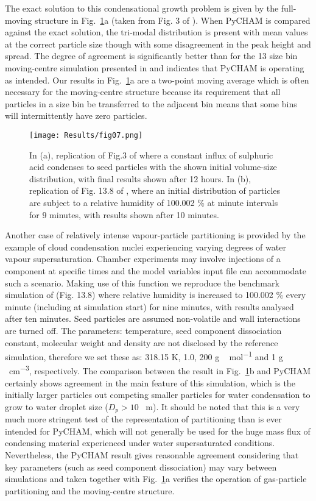 \documentclass[gmd, manuscript]{copernicus}
\begin{document}
The exact solution to this condensational growth problem is given by the full-moving structure in Fig.~\ref{fig:mov_cen_test}a (taken from Fig. 3 of \citet{Zhang1999}).  When PyCHAM is compared against the exact solution, the tri-modal distribution is present with mean values at the correct particle size though with some disagreement in the peak height and spread.  The degree of agreement is significantly better than for the 13 size bin moving-centre simulation presented in \citet{Zhang1999} and indicates that PyCHAM is operating as intended.  Our results in Fig.~\ref{fig:mov_cen_test}a are a two-point moving average which is often necessary for the moving-centre structure because its requirement that all particles in a size bin be transferred to the adjacent bin means that some bins will intermittently have zero particles.

\begin{figure}[t]
\texttt{[image: Results/fig07.png]}
\caption{In (a), replication of Fig.3 of \citet{Zhang1999} where a constant influx of sulphuric acid condenses to seed particles with the shown initial volume-size distribution, with final results shown after 12 hours.  In (b), replication of Fig. 13.8 of \citet{Jacobson2005}, where an initial distribution of particles are subject to a relative humidity of 100.002 \% at minute intervals for 9 minutes, with results shown after 10 minutes.}
\label{fig:mov_cen_test}
\end{figure}

Another case of relatively intense vapour-particle partitioning is provided by the example of cloud condensation nuclei experiencing varying degrees of water vapour supersaturation.  Chamber experiments may involve injections of a component at specific times and the model variables input file can accommodate such a scenario.  Making use of this function we reproduce the benchmark simulation of \citet{Jacobson2005} (Fig. 13.8) where relative humidity is increased to 100.002 \% every minute (including at simulation start) for nine minutes, with results analysed after ten minutes.  Seed particles are assumed non-volatile and wall interactions are turned off.  The parameters: temperature, seed component dissociation constant, molecular weight and density are not disclosed by the reference simulation, therefore we set these as: 318.15 \unit{K}, 1.0, 200 \unit{g\,mol^{-1}} and 1 \unit{g\,cm^{-3}}, respectively.  The comparison between the \citet{Jacobson2005} result in Fig.~\ref{fig:mov_cen_test}b and PyCHAM certainly shows agreement in the main feature of this simulation, which is the initially larger particles out competing smaller particles for water condensation to grow to water droplet size ($D_{p}>10$ \unit{\mu m}).  It should be noted that this is a very much more stringent test of the representation of partitioning than is ever intended for PyCHAM, which will not generally be used for the huge mass flux of condensing material experienced under water supersaturated conditions.  Nevertheless, the PyCHAM result gives reasonable agreement considering that key parameters (such as seed component dissociation) may vary between simulations and taken together with Fig.~\ref{fig:mov_cen_test}a verifies the operation of gas-particle partitioning and the moving-centre structure.
\end{document}
